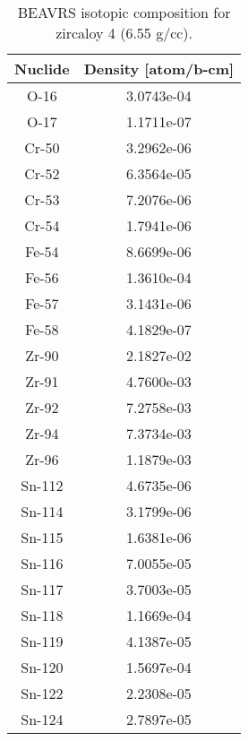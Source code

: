\begin{appendices}
\begin{table}[h!]
  \centering
  \caption[BEAVRS isotopic composition for zircaloy]{BEAVRS isotopic composition for zircaloy 4 (6.55 g/cc).}
  \footnotesize
  \label{table:chap7-beavrs-isotopes-3.1-zircaloy}
  \vspace{6pt}
  \begin{tabular}{c c}
  \toprule
  \rowcolor{lightgray}
  {\bf Nuclide} &
  {\bf Density [atom/b-cm]} \\
  \midrule
  O-16 & 3.0743e-04 \\
  O-17 & 1.1711e-07 \\
  Cr-50 & 3.2962e-06 \\
  Cr-52 & 6.3564e-05 \\
  Cr-53 & 7.2076e-06 \\
  Cr-54 & 1.7941e-06 \\
  Fe-54 & 8.6699e-06 \\
  Fe-56 & 1.3610e-04 \\
  Fe-57 & 3.1431e-06 \\
  Fe-58 & 4.1829e-07 \\
  Zr-90 & 2.1827e-02 \\
  Zr-91 & 4.7600e-03 \\
  Zr-92 & 7.2758e-03 \\
  Zr-94 & 7.3734e-03 \\
  Zr-96 & 1.1879e-03 \\
  Sn-112 & 4.6735e-06 \\
  Sn-114 & 3.1799e-06 \\
  Sn-115 & 1.6381e-06 \\
  Sn-116 & 7.0055e-05 \\
  Sn-117 & 3.7003e-05 \\
  Sn-118 & 1.1669e-04 \\
  Sn-119 & 4.1387e-05 \\
  Sn-120 & 1.5697e-04 \\
  Sn-122 & 2.2308e-05 \\
  Sn-124 & 2.7897e-05 \\
  \bottomrule
\end{tabular}
\end{table}


\end{appendices}
